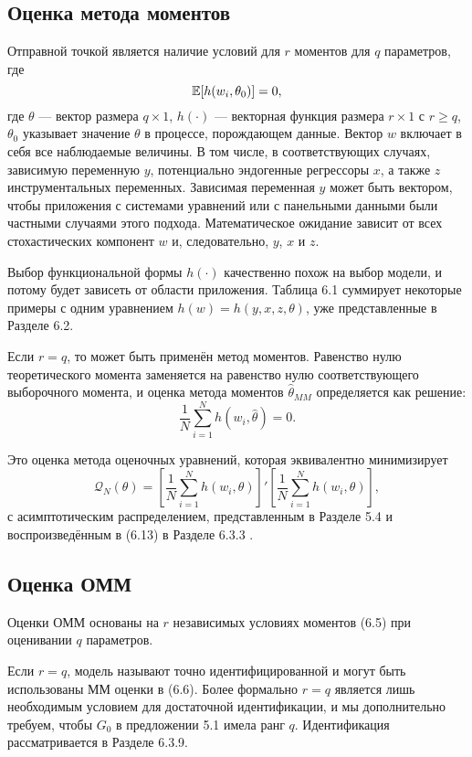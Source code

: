 \subsection{Оценка метода моментов}

Отправной точкой является наличие условий для $r$ моментов для $q$ параметров, где \begin{equation}
\mathbb{E}[h(w_i,\theta_0)]=0,
\end{equation}
где $\theta$ --- вектор размера $q \times 1$, $h(\cdot)$ --- векторная функция размера $r \times 1$ с $r \ge q$, $\theta_0$ указывает значение $\theta$ в процессе, порождающем данные. Вектор $w$ включает в себя все наблюдаемые величины. В том числе, в соответствующих случаях, зависимую переменную $y$, потенциально эндогенные регрессоры $x$, а также $z$ инструментальных переменных. Зависимая переменная $y$ может быть вектором, чтобы приложения с системами уравнений или с панельными данными были частными случаями этого подхода. Математическое ожидание зависит от всех стохастических компонент $w$ и, следовательно, $y$, $x$ и $z$.

Выбор функциональной формы $h(\cdot)$ качественно похож на выбор модели, и потому будет зависеть от области приложения. Таблица 6.1 суммирует некоторые примеры с одним уравнением $h(w)=h(y,x,z,\theta)$, уже представленные в Разделе 6.2.

Если $r=q$, то может быть применён метод моментов. Равенство нулю теоретического момента заменяется на равенство нулю соответствующего выборочного момента, и оценка метода моментов $\hat{\theta}_{MM}$ определяется как решение:
\begin{equation}
\frac{1}{N} \sum_{i=1}^{N} h(w_i,\hat{\theta})=0.
\end{equation}

Это оценка метода оценочных уравнений, которая эквивалентно минимизирует 
\[
\mathcal{Q}_{N}(\theta)= \left[ \frac{1}{N} \sum_{i=1}^{N} h(w_i,\theta) \right]' \left[ \frac{1}{N} \sum_{i=1}^{N} h(w_i,\theta) \right],
\]
с асимптотическим распределением, представленным в Разделе 5.4 и воспроизведённым в (6.13) в Разделе 6.3.3 .

\subsection{Оценка ОММ}

Оценки ОММ основаны на $r$ независимых условиях моментов (6.5) при оценивании $q$ параметров.

Если $r=q$, модель называют точно идентифицированной и могут быть использованы ММ оценки в (6.6). Более формально $r=q$ является лишь необходимым условием для достаточной идентификации, и мы дополнительно требуем, чтобы $G_0$ в предложении 5.1 имела ранг $q$. Идентификация рассматривается в Разделе 6.3.9.

